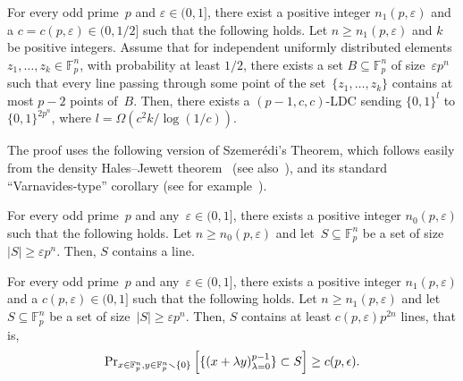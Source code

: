 \documentclass{toc}
\newcommand{\bset}[1]{\{0,1\}^{#1}} %
\newcommand{\eps}{\varepsilon}
\newcommand{\F}{{\mathbb{F}}}
\renewcommand{\Pr}{\mbox{\rm Pr}}
\begin{document}
\begin{corollary}\label{cor:lines_ldcs}
For every odd prime~$p$ and $\eps \in (0,1]$, there exist a positive integer $n_1(p,\eps)$ and a $c = c(p,\eps)\in (0,1/2]$ such that the following holds.
Let $n \geq n_1(p,\eps)$ and $k$ be positive integers.
Assume that for independent uniformly distributed elements $z_1,\dots,z_k\in \F_p^n$, with probability at least $1/2$, there exists a set $B\subseteq \F_p^n$ of size~$\eps p^n$ such that
every line %
passing through some point of the set~$\{z_1,\dots,z_k\}$ contains at most $p-2$ points of~$B$.
Then, there exists a $(p-1, c,c)$-LDC sending $\bset{l}$ to $\bset{2p^n}$, where  $l=\Omega(c^2 k/\log(1/c))$.
\end{corollary}

%
The proof uses the following version of Szemer\'edi's Theorem, which follows easily from the density Hales--Jewett theorem~\cite{Furstenberg1991} (see also~\cite[Theorem~1.5.4]{Tao:2012}), and its standard ``Varnavides-type'' corollary (see for example~\cite[Exercise~10.1.9]{Tao:2006}).

\begin{theorem}\label{thm:szemeredi}
For every odd prime~$p$ and any~$\eps\in (0,1]$, there exists a positive integer $n_0(p,\eps)$ such that the following holds.
Let $n \geq n_0(p,\eps)$ and let~$S \subseteq \F_p^n$ be a set of size~$|S|  \geq \eps p^n$.
Then, $S$ contains a  line. %
\end{theorem}

\begin{corollary}
\label{cor:varnavides}
For every odd prime~$p$ and any~$\eps\in (0,1]$, there exists a positive integer $n_1(p,\eps)$ and a $c(p,\eps)\in(0,1]$ such that the following holds.
Let $n \geq n_1(p,\eps)$ and let~$S \subseteq \F_p^n$ be a set of size~$|S|  \geq \eps p^n$.
Then, $S$ contains at least $c(p,\eps)p^{2n}$  lines, %
that is,
$$\Pr_{x\in \F_p^n, y\in \F_p^n\smallsetminus\{0\}}\left[\{(x+\lambda y)_{\lambda=0}^{p-1}\}\subset S\right]\ge c(p,\epsilon).$$
\end{corollary}
\end{document}
